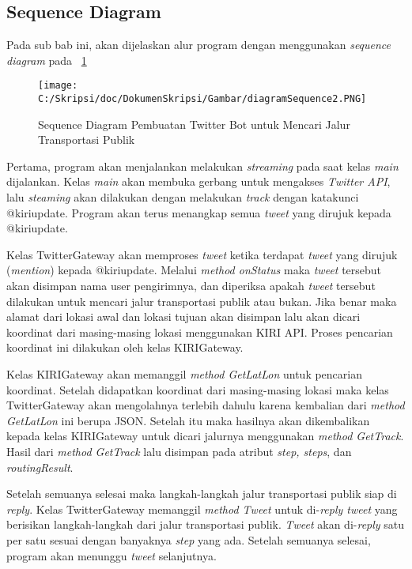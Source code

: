 \subsection{Sequence Diagram}

Pada sub bab ini, akan dijelaskan alur program dengan menggunakan \textit{sequence diagram} pada ~\ref{fig:diagramSequence2}

\begin{figure}[htbp]
	\centering
		\texttt{[image: C:/Skripsi/doc/DokumenSkripsi/Gambar/diagramSequence2.PNG]}
	\caption{Sequence Diagram Pembuatan Twitter Bot untuk Mencari Jalur Transportasi Publik}
	\label{fig:diagramSequence2}
\end{figure}


Pertama, program akan menjalankan melakukan \textit{streaming} pada saat kelas \textit{main} dijalankan. Kelas \textit{main} akan membuka gerbang untuk mengakses \textit{Twitter API}, lalu \textit{steaming} akan dilakukan dengan melakukan \textit{track} dengan katakunci @kiriupdate. Program akan terus menangkap semua \textit{tweet} yang dirujuk kepada @kiriupdate.

Kelas TwitterGateway akan memproses \textit{tweet} ketika terdapat \textit{tweet} yang dirujuk (\textit{mention}) kepada @kiriupdate. Melalui \textit{method onStatus} maka \textit{tweet} tersebut akan disimpan nama user pengirimnya, dan diperiksa apakah \textit{tweet} tersebut dilakukan untuk mencari jalur transportasi publik atau bukan. Jika benar maka alamat dari lokasi awal dan lokasi tujuan akan disimpan lalu akan dicari koordinat dari masing-masing lokasi menggunakan KIRI API. Proses pencarian koordinat ini dilakukan oleh kelas KIRIGateway.

Kelas KIRIGateway akan memanggil \textit{method GetLatLon} untuk pencarian koordinat. Setelah didapatkan koordinat dari masing-masing lokasi maka kelas TwitterGateway akan mengolahnya terlebih dahulu karena kembalian dari \textit{method GetLatLon} ini berupa JSON. Setelah itu maka hasilnya akan dikembalikan kepada kelas KIRIGateway untuk dicari jalurnya menggunakan \textit{method GetTrack}. Hasil dari \textit{method GetTrack} lalu disimpan pada atribut \textit{step, steps}, dan \textit{routingResult}.

Setelah semuanya selesai maka langkah-langkah jalur transportasi publik siap di \textit{reply}. Kelas TwitterGateway memanggil \textit{method Tweet} untuk di-\textit{reply tweet} yang berisikan langkah-langkah dari jalur transportasi publik. \textit{Tweet} akan di-\textit{reply} satu per satu sesuai dengan banyaknya \textit{step} yang ada. Setelah semuanya selesai, program akan menunggu \textit{tweet} selanjutnya.

